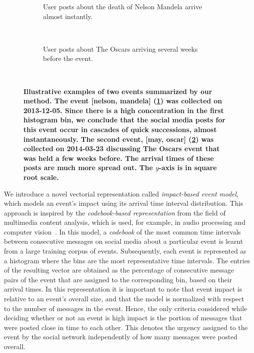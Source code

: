 \documentclass[10pt,letterpaper]{article}
\newcommand{\newtext}[1]{{\leavevmode\color{blue}#1}}
\begin{document}
\begin{figure}
  \centering
  \begin{subfigure}{\textwidth}
    \caption{User posts about the death of Nelson Mandela arrive
      almost instantly.}
    \label{fig:nelson_mandela}
  \end{subfigure}%

  ~ %
  \begin{subfigure}{\textwidth}
    \caption{User posts about The Oscars arriving several weeks before
      the event.}
    \label{fig:oscars}
  \end{subfigure}%
  ~ %

  \caption{\textbf{Illustrative examples of two events
      summarized by our method. The event [nelson, mandela] (\ref{fig:nelson_mandela}) was
      collected on 2013-12-05. Since there is a high
      concentration in the first histogram bin, we conclude that the social media posts
      for this event occur in cascades of quick successions, almost
      instantaneously. The second event, [may, oscar] (\ref{fig:oscars}) was collected
      on 2014-03-23 discussing The Oscars event that was held a few
      weeks before. The arrival times of these posts are much more spread
      out. The $y$-axis is in square root scale.} 
  }
  \label{fig:example_buzz}
\end{figure}

\newtext{ 
We introduce a novel vectorial representation called {\em
    impact-based event model}, which models an event's impact using
  its arrival time interval distribution.  This approach is inspired
  by the {\em codebook-based representation} from the field of
  multimedia content analysis, which is used, for example, in audio
  processing and computer vision~\cite{ff,Vaizman}.  In this model, a
  \emph{codebook} of the most common time intervals between
  consecutive messages on social media about a particular event is
  learnt from a large training corpus of events.  Subsequently, each
  event is represented as a histogram where the bins are the most
  representative time intervals.  The entries of the resulting vector
  are obtained as the percentage of consecutive message pairs of the
  event that are assigned to the corresponding bin, based on their
  arrival times.  In this representation it is important to note that
  event impact is relative to an event's overall size, and that the
  model is normalized with respect to the number of messages in the
  event. Hence, the only criteria considered while deciding whether or
  not an event is high impact is the portion of messages that were
  posted close in time to each other. This denotes the urgency
  assigned to the event by the social network independently of how
  many messages were posted overall.  }
\end{document}

